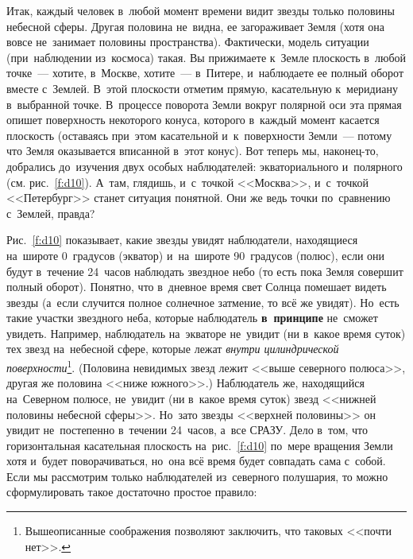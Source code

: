 Итак, каждый человек в~любой момент времени видит звезды только половины небесной сферы. Другая
половина не~видна, ее загораживает Земля (хотя она вовсе не~занимает половины пространства).
Фактически, модель ситуации (при~наблюдении из~космоса) такая. Вы прижимаете к~Земле плоскость
в~любой точке~--- хотите, в~Москве, хотите~--- в~Питере, и~наблюдаете ее полный оборот вместе
с~Землей. В~этой плоскости отметим прямую, касательную к~меридиану в~выбранной точке. В~процессе
поворота Земли вокруг полярной оси эта прямая опишет поверхность некоторого конуса, которого
в~каждый момент касается плоскость (оставаясь при~этом касательной и~к~поверхности Земли~---
потому что Земля оказывается вписанной в~этот конус).
 Вот теперь мы, наконец-то, добрались до~изучения
двух особых наблюдателей: экваториального и~полярного (см. рис.~\ref{f:d10}). А~там, глядишь, и~с~точкой
<<Москва>>, и~с~точкой <<Петербург>> станет ситуация понятной. Они же ведь точки по~сравнению
с~Землей, правда?


Рис.~\ref{f:d10} показывает, какие звезды увидят наблюдатели, находящиеся на~широте 0~градусов
(экватор) и~на~широте 90~градусов (полюс), если они будут в~течение 24~часов наблюдать звездное
небо (то есть пока Земля совершит полный оборот). Понятно, что в~дневное время свет Солнца помешает
видеть звезды (а~если случится полное солнечное затмение, то всё же увидят). Но~есть такие участки
звездного неба, которые наблюдатель \textbf{в~принципе} не~сможет увидеть. Например, наблюдатель на~экваторе
не~увидит (ни в~какое время суток) тех звезд на~небесной сфере, которые лежат \textit{внутри цилиндрической
поверхности}\footnote{Вышеописанные соображения позволяют заключить, что таковых <<почти нет>>.}.
 (Половина невидимых звезд лежит <<выше северного полюса>>, другая же половина <<ниже
южного>>.) Наблюдатель же, находящийся на~Северном полюсе, не~увидит (ни в~какое время суток) звезд
<<нижней половины небесной сферы>>. Но~зато звезды <<верхней половины>> он увидит не~постепенно
в~течении 24~часов, а~все СРАЗУ. Дело в~том, что горизонтальная касательная плоскость на~рис.~\ref{f:d10}
по~мере вращения Земли хотя и~будет поворачиваться, но~она всё время будет совпадать сама с~собой.
Если мы рассмотрим только наблюдателей из~северного полушария, то можно сформулировать такое
достаточно простое правило:


